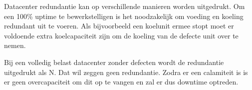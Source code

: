 Datacenter redundantie kan op verschillende manieren worden uitgedrukt. Om een 100\% uptime te bewerkstelligen is het noodzakelijk om voeding en koeling redundant uit te voeren. Als bijvoorbeeld een koelunit ermee stopt moet er voldoende extra koelcapaciteit zijn om de koeling van de defecte unit over te nemen.

Bij een volledig belast datacenter zonder defecten wordt de redundantie uitgedrukt als N. Dat wil zeggen geen redundantie. Zodra er een calamiteit is is er geen overcapaciteit om dit op te vangen en zal er dus downtime optreden.
